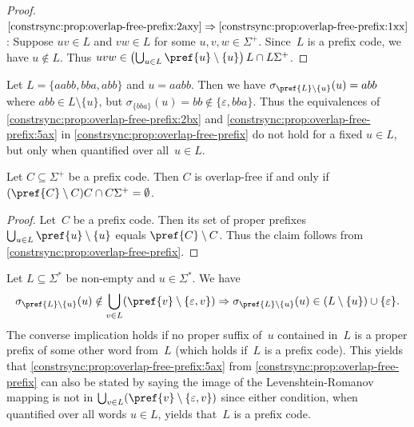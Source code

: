 \begin{proof}
$\ref{constrsync:prop:overlap-free-prefix:2axy} \Rightarrow 
\ref{constrsync:prop:overlap-free-prefix:1xx}$:
Suppose $uv \in L$ and $vw \in L$ for some $u,v,w \in \Sigma^+$.
Since~$L$ is a prefix code, we have $u \notin L$.
Thus 
$uvw \in \left(\bigcup_{u \in L} \pref{u}\setminus\{u\} \right) L \cap L\Sigma^+$.
\end{proof}

\begin{remark}
	Let $L = \{ aabb, bba, abb \}$ and $u = aabb$.
	Then we have $\sigma_{\pref{L} \setminus \{u\}}(u) = abb$
	where $abb \in L \setminus \{u\}$,
	but $\sigma_{\{bba\}}(u) = bb \notin \{\varepsilon, bba\}$.	
	Thus the equivalences of \cref{constrsync:prop:overlap-free-prefix:2bx} 
	and \cref{constrsync:prop:overlap-free-prefix:5ax}
	in \cref{constrsync:prop:overlap-free-prefix}
	do not hold for a fixed $u \in L$, but only when quantified
	over all~$u \in L$.	
\end{remark}

\begin{corollary}\label{lem:overlap-free-prefix}
	Let $C \subseteq \Sigma^+$ be a prefix code.
	Then $C$ is overlap-free if and only if $(\pref{C} \setminus C) C \cap C \Sigma^+ = \emptyset$.
\end{corollary} 
\begin{proof}
	Let~$C$ be a prefix code.
	Then its set of proper prefixes
	$\bigcup_{u \in L} \pref{u}\setminus\{u\}$
	equals $\pref{C}\setminus C$.
	Thus the claim follows from \cref{constrsync:prop:overlap-free-prefix}.
\end{proof}

\begin{remark}
	Let $L \subseteq \Sigma^*$ be non-empty and $u \in \Sigma^*$.
	We have
	\[
	\sigma_{\pref{L}\setminus \{u\}}(u) \notin \bigcup_{v \in L} ( \pref{v} \setminus \{\varepsilon,v\} )
	\Rightarrow
	\sigma_{\pref{L} \setminus \{u\}}(u) \in ( L \setminus \{u\} ) \cup \{\varepsilon\}.
	\]
	The converse implication holds if no proper suffix of~$u$ contained in~$L$
	is a proper prefix of some other word from~$L$ (which holds if~$L$ is a prefix code).
	This yields that \cref{constrsync:prop:overlap-free-prefix:5ax} 
	from \cref{constrsync:prop:overlap-free-prefix}
	can also be stated by saying the image of the Levenshtein-Romanov mapping
	is not in $\bigcup_{v \in L} ( \pref{v} \setminus \{\varepsilon,v\} )$
	since either condition, when quantified over all words $u \in L$,
	yields that~$L$ is a prefix code.
\end{remark}

